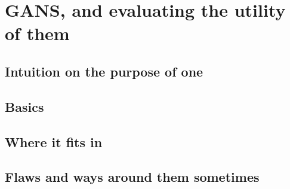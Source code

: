 \section {GANS, and evaluating the utility of them}
\subsection{Intuition on the purpose of one}
\subsection{Basics}
\subsection{ Where it fits in}
\subsection{Flaws and ways around them sometimes}
